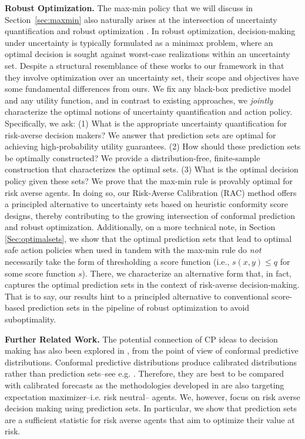 \textbf{Robust Optimization.} The max-min policy that we will discuss in Section~\ref{sec:maxmin} also naturally arises at the intersection of uncertainty quantification and robust optimization \citep{patel2024conformal, johnstone2021conformal, chenreddy2024end, li2025data, yeh2024end, cao2024non, wang2023learning, lou2024estimation, patel2024non, elmachtoub2023estimate, lin2024conformal, chan2024conformal, chan2023inverse, chan2020inverse}. 
In robust optimization, decision-making under uncertainty is typically formulated as a minimax problem, where an optimal decision is sought against worst-case realizations within an uncertainty set. Despite a structural resemblance of these works to our framework in that they involve optimization over an uncertainty set,  their scope and objectives have some fundamental differences from ours. We fix any black-box predictive model and any utility function, and in contrast to existing approaches, we \emph{jointly} characterize the optimal notions of uncertainty quantification and action policy. Specifically, we ask: (1) What is the appropriate uncertainty quantification for risk-averse decision makers? We answer that prediction sets are optimal for achieving high-probability utility guarantees. (2) How should these prediction sets be optimally constructed? We provide a distribution-free, finite-sample construction that characterizes the optimal sets. (3) What is the optimal decision policy given these sets? We prove that the max-min rule is provably optimal for risk averse agents. In doing so, our Risk-Averse Calibration (RAC) method offers a principled alternative to uncertainty sets based on heuristic conformity score designs, thereby contributing to the growing intersection of conformal prediction and robust optimization. Additionally, on a more technical note, in Section \ref{Sec:optimalsets}, we show that the optimal prediction sets that lead to optimal safe action policies when used in tandem with the max-min rule do \emph{not} necessarily take the form of thresholding a score function (i.e., $s(x,y) \leq q$ for some score function $s$). There, we characterize an alternative form that, in fact, captures the optimal prediction sets in the context of risk-averse decision-making. That is to say, our results hint to a principled alternative to conventional score-based prediction sets in the pipeline of robust optimization to avoid suboptimality.

\textbf{Further Related Work.} The potential connection of CP ideas to decision making has also been explored in \citet{vovk2018conformal}, from the point of view of conformal predictive distributions. Conformal predictive distributions produce calibrated distributions rather than prediction sets--see e.g. \cite{vovk2017nonparametric, vovk2018cross, vovk2020computationally}. Therefore, they are best to be compared with calibrated forecasts as the methodologies developed in \citet{vovk2018conformal} are also targeting expectation maximizer--i.e. risk neutral-- agents. We, however, focus on risk averse decision making using prediction sets. In particular, we show that prediction sets are a sufficient statistic for risk averse agents that aim to optimize their value at risk. 

